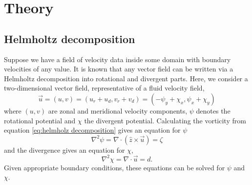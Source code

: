 \documentclass[draft]{agujournal2019}
\begin{document}
\section{Theory}
\subsection{Helmholtz decomposition} \label{sec:Helmholz decomposition}
Suppose we have a field of velocity data inside some domain with boundary velocities of any value. It is known that any vector field can be written via a Helmholtz decomposition into rotational and divergent parts. Here, we consider a two-dimensional vector field, representative of a fluid velocity field, 
\begin{equation}
    \vec{u} = (u,v) = (u_r + u_d, v_r + v_d) = (-\psi_y + \chi_x, \psi_x + \chi_y) \label{eq:helmholz decomposition}
\end{equation}
where $(u,v)$ are zonal and meridional velocity components, $\psi$ denotes the rotational potential and $\chi$ the divergent potential. Calculating the vorticity from equation \eqref{eq:helmholz decomposition} gives an equation for $\psi$ 
\begin{equation}
    \nabla^2 \psi = \nabla \cdot ( \hat{z} \times \vec{u} ) = \zeta
\end{equation}
and the divergence gives an equation for $\chi$,
\begin{equation}
    \nabla^2 \chi = \nabla \cdot \vec{u} = d.
\end{equation}
Given appropriate boundary conditions, these equations can be solved for $\psi$ and $\chi$.
\end{document}
